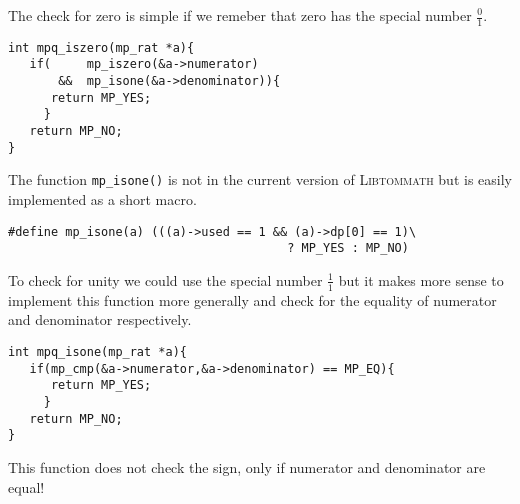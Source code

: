 \documentclass[10pt]{book}
\newcommand{\aname}[1]{{\scshape{#1}}}
\theoremstyle{definition}
\theoremstyle{remark}
\begin{document}
The check for zero is simple if we remeber that zero has the special number
$\tfrac{0}{1}$.
 \begin{center}
    \begin{lstlisting}[caption={Check for Zero},label=checkzero]
int mpq_iszero(mp_rat *a){
   if(     mp_iszero(&a->numerator)
       &&  mp_isone(&a->denominator)){
      return MP_YES;
     }
   return MP_NO;
}
    \end{lstlisting}
  \end{center}
The function \lstinline!mp_isone()! is not in the current version of
\aname{Libtommath} but is easily implemented as a short macro.
 \begin{center}
    \begin{lstlisting}[caption={Test a mp\_int for Unity},label=mpinttestone]
#define mp_isone(a) (((a)->used == 1 && (a)->dp[0] == 1)\
                                       ? MP_YES : MP_NO)
    \end{lstlisting}
  \end{center}
To check for unity we could use the special number $\tfrac{1}{1}$ but it makes
more sense to implement this function more generally and check for the equality
of numerator and denominator respectively.
 \begin{center}
    \begin{lstlisting}[caption={test for Unity},label=checkforone]
int mpq_isone(mp_rat *a){
   if(mp_cmp(&a->numerator,&a->denominator) == MP_EQ){
      return MP_YES;
     }
   return MP_NO;
}
    \end{lstlisting}
  \end{center}
This function does not check the sign, only if numerator and denominator are
equal!
\end{document}
